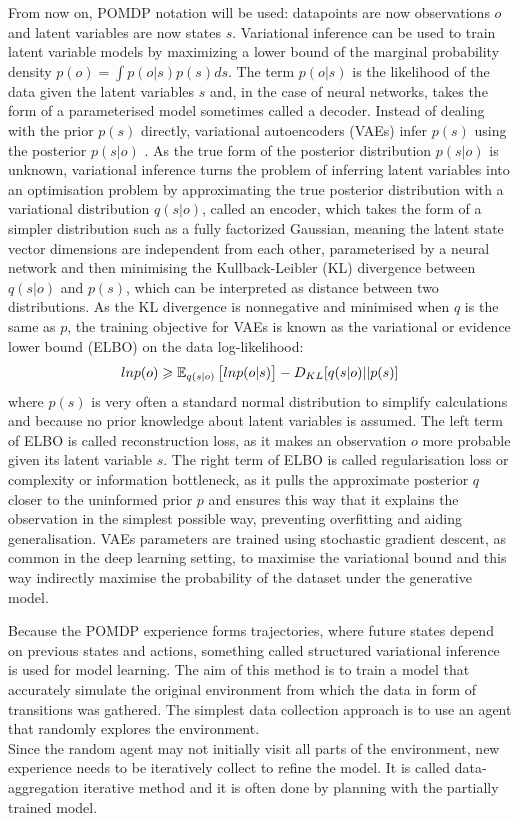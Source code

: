 From now on, POMDP notation will be used: datapoints are now observations $o$ and latent variables are now states $s$. Variational inference can be used to train latent variable models by maximizing a lower bound of the marginal probability density $p(o) = \int p(o|s)p(s)ds$. The term $p(o|s)$ is the likelihood of the data given the latent variables $s$ and, in the case of neural networks, takes the form of a parameterised model sometimes called a decoder. Instead of dealing with the prior $p(s)$ directly, variational autoencoders (VAEs) infer $p(s)$ using the posterior $p(s|o)$ \cite{Algo.VAE}. As the true form of the posterior distribution $p(s|o)$ is unknown, variational inference turns the problem of inferring latent variables into an optimisation problem by approximating the true posterior distribution with a variational distribution $q(s|o)$, called an encoder, which takes the form of a simpler distribution such as a fully factorized Gaussian, meaning the latent state vector dimensions are independent from each other, parameterised by a neural network and then minimising the Kullback-Leibler (KL) divergence between $q(s|o)$ and $p(s)$, which can be interpreted as distance between two distributions. As the KL divergence is nonnegative and minimised when $q$ is the same as $p$, the training objective for VAEs is known as the variational or evidence lower bound (ELBO) on the data log-likelihood:
$$ln p(o) \geqslant \operatorname{\mathbb{E}}_{q(s|o)}\big[ ln p(o|s) \big] - D_{KL}[q(s|o)||p(s)]$$
where $p(s)$ is very often a standard normal distribution to simplify calculations and because no prior knowledge about latent variables is assumed. The left term of ELBO is called reconstruction loss, as it makes an observation $o$ more probable given its latent variable $s$. The right term of ELBO is called regularisation loss or complexity or information bottleneck, as it pulls the approximate posterior $q$ closer to the uninformed prior $p$ and ensures this way that it explains the observation in the simplest possible way, preventing overfitting and aiding generalisation. VAEs parameters are trained using stochastic gradient descent, as common in the deep learning setting, to maximise the variational bound and this way indirectly maximise the probability of the dataset under the generative model.

Because the POMDP experience forms trajectories, where future states depend on previous states and actions, something called structured variational inference is used for model learning. The aim of this method is to train a model that accurately simulate the original environment from which the data in form of transitions was gathered. The simplest data collection approach is to use an agent that randomly explores the environment. \\
Since the random agent may not initially visit all parts of the environment, new experience needs to be iteratively collect to refine the model. It is called data-aggregation iterative method and it is often done by planning with the partially trained model.

